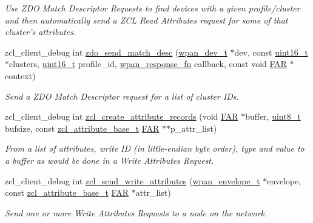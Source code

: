 \begin{DoxyCompactItemize}
\begin{DoxyCompactList}\small\item\em Use Z\-D\-O Match Descriptor Requests to find devices with a given profile/cluster and then automatically send a Z\-C\-L Read Attributes request for some of that cluster's attributes. \end{DoxyCompactList}\item 
zcl\-\_\-client\-\_\-debug int \hyperlink{group__zcl__client_ga4c75937cc0fa5c70c63f30b59a4ddebc}{zdo\-\_\-send\-\_\-match\-\_\-desc} (\hyperlink{structwpan__dev__t}{wpan\-\_\-dev\-\_\-t} $\ast$dev, const \hyperlink{group__hal_ga5a8b2dc9e45a9ee81a94ef304fb62505}{uint16\-\_\-t} $\ast$clusters, \hyperlink{group__hal_ga5a8b2dc9e45a9ee81a94ef304fb62505}{uint16\-\_\-t} profile\-\_\-id, \hyperlink{group__wpan__aps_gaffe7bb679e9ba6de49f68fdc584fbefb}{wpan\-\_\-response\-\_\-fn} callback, const void \hyperlink{group__hal_gaef060b3456fdcc093a7210a762d5f2ed}{F\-A\-R} $\ast$context)
\begin{DoxyCompactList}\small\item\em Send a Z\-D\-O Match Descriptor request for a list of cluster I\-Ds. \end{DoxyCompactList}\item 
zcl\-\_\-client\-\_\-debug int \hyperlink{group__zcl__client_ga11f72950e4467286ef18468fbcb4bed4}{zcl\-\_\-create\-\_\-attribute\-\_\-records} (void \hyperlink{group__hal_gaef060b3456fdcc093a7210a762d5f2ed}{F\-A\-R} $\ast$buffer, \hyperlink{group__hal_gae1affc9ca37cfb624959c866a73f83c2}{uint8\-\_\-t} bufsize, const \hyperlink{structzcl__attribute__base__t}{zcl\-\_\-attribute\-\_\-base\-\_\-t} \hyperlink{group__hal_gaef060b3456fdcc093a7210a762d5f2ed}{F\-A\-R} $\ast$$\ast$p\-\_\-attr\-\_\-list)
\begin{DoxyCompactList}\small\item\em From a list of attributes, write I\-D (in little-\/endian byte order), type and value to a buffer as would be done in a Write Attributes Request. \end{DoxyCompactList}\item 
zcl\-\_\-client\-\_\-debug int \hyperlink{group__zcl__client_ga98550adc25d4a19e4048ef9b251321ef}{zcl\-\_\-send\-\_\-write\-\_\-attributes} (\hyperlink{structwpan__envelope__t}{wpan\-\_\-envelope\-\_\-t} $\ast$envelope, const \hyperlink{structzcl__attribute__base__t}{zcl\-\_\-attribute\-\_\-base\-\_\-t} \hyperlink{group__hal_gaef060b3456fdcc093a7210a762d5f2ed}{F\-A\-R} $\ast$attr\-\_\-list)
\begin{DoxyCompactList}\small\item\em Send one or more Write Attributes Requests to a node on the network. \end{DoxyCompactList}\item 
$$
\end{DoxyCompactItemize}
